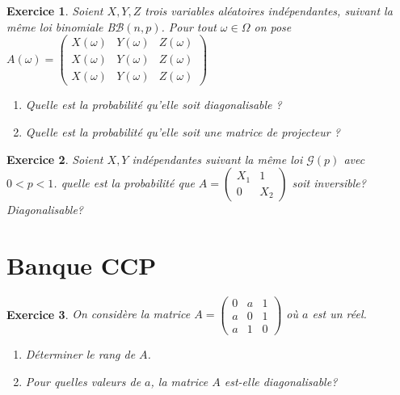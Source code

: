 \documentclass[12pt,a4paper]{article}
\theoremstyle{break}
\theoremstyle{break}
\newtheorem{Exo}{Exercice}
\begin{document}
\begin{Exo}
	Soient $X,Y,Z$ trois variables aléatoires indépendantes, suivant la même loi binomiale B$\mathcal{B}(n,p)$. Pour tout $\omega\in\Omega$ on pose $A(\omega)=\begin{pmatrix}
		X(\omega)	& Y(\omega) & Z(\omega) \\
		X(\omega)& Y(\omega) & Z(\omega) \\
		X(\omega)& Y(\omega) & Z(\omega)
	\end{pmatrix}$
	\begin{enumerate}
		\item Quelle est la probabilité qu'elle soit diagonalisable ?
		\item Quelle est la probabilité qu'elle soit une matrice de projecteur ?	
	\end{enumerate}
\end{Exo}

\begin{Exo}
	Soient $X,Y$ indépendantes suivant la même loi $\mathcal{G}(p)$ avec $0<p<1$. quelle est la probabilité que $A=\begin{pmatrix}
		X_1	& 1 \\
		0	& X_2
	\end{pmatrix}$ soit inversible? Diagonalisable?
\end{Exo}


\section*{Banque CCP}



\begin{Exo}
	On considère la matrice $A=\begin{pmatrix}
	0&a&1\\
	a&0&1\\
	a&1&0
\end{pmatrix}$ où $a$ est un réel.
\begin{enumerate}
	\item
	Déterminer le rang de $A$.
	\item
	Pour quelles valeurs de $a$, la matrice $A$ est-elle diagonalisable? 
\end{enumerate}
\end{Exo}
\end{document}
